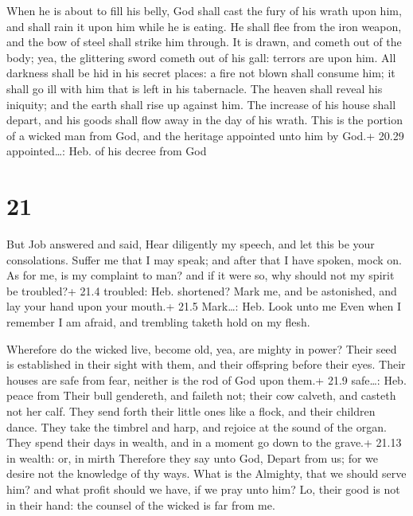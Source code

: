  When he is about to fill his belly, God shall cast the
fury of his wrath upon him, and shall rain it upon him while he is
eating.  He shall flee from the iron weapon, and the bow of
steel shall strike him through.  It is drawn, and cometh
out of the body; yea, the glittering sword cometh out of his gall:
terrors are upon him.  All darkness shall be hid in his
secret places: a fire not blown shall consume him; it shall go ill with
him that is left in his tabernacle.  The heaven shall
reveal his iniquity; and the earth shall rise up against him.
 The increase of his house shall depart, and his goods
shall flow away in the day of his wrath.  This is the
portion of a wicked man from God, and the heritage appointed unto him by
God.+ 20.29 appointed\ldots: Heb. of his decree from God

\hypertarget{section-20}{%
\section{21}\label{section-20}}

 But Job answered and said,  Hear diligently my
speech, and let this be your consolations.  Suffer me that I
may speak; and after that I have spoken, mock on.  As for
me, is my complaint to man? and if it were so, why should not my spirit
be troubled?+ 21.4 troubled: Heb. shortened?  Mark me, and
be astonished, and lay your hand upon your mouth.+ 21.5 Mark\ldots: Heb.
Look unto me  Even when I remember I am afraid, and
trembling taketh hold on my flesh.

 Wherefore do the wicked live, become old, yea, are mighty
in power?  Their seed is established in their sight with
them, and their offspring before their eyes.  Their houses
are safe from fear, neither is the rod of God upon them.+ 21.9
safe\ldots: Heb. peace from  Their bull gendereth, and
faileth not; their cow calveth, and casteth not her calf. 
They send forth their little ones like a flock, and their children
dance.  They take the timbrel and harp, and rejoice at the
sound of the organ.  They spend their days in wealth, and
in a moment go down to the grave.+ 21.13 in wealth: or, in mirth
 Therefore they say unto God, Depart from us; for we desire
not the knowledge of thy ways.  What is the Almighty, that
we should serve him? and what profit should we have, if we pray unto
him?  Lo, their good is not in their hand: the counsel of
the wicked is far from me.

